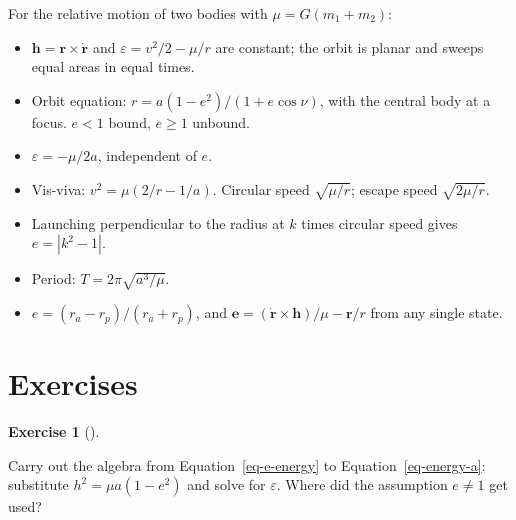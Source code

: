 \documentclass[
  10.5pt,
  letterpaper,
]{scrbook}
\providecommand{\tightlist}{%
  \setlength{\itemsep}{0pt}\setlength{\parskip}{0pt}}
\theoremstyle{definition}
\newtheorem{exercise}{Exercise}[chapter]
\theoremstyle{plain}
\theoremstyle{remark}
\begin{document}
\begin{tcolorbox}[enhanced jigsaw, arc=.35mm, bottomrule=.15mm, bottomtitle=1mm, breakable, colback=white, colbacktitle=quarto-callout-tip-color!10!white, colframe=quarto-callout-tip-color-frame, coltitle=black, left=2mm, leftrule=.75mm, opacityback=0, opacitybacktitle=0.6, rightrule=.15mm, title={Key results}, titlerule=0mm, toprule=.15mm, toptitle=1mm]

For the relative motion of two bodies with \(\mu = G(m_1 + m_2)\):

\begin{itemize}
\tightlist
\item
  \(\mathbf{h} = \mathbf{r}\times\dot{\mathbf{r}}\) and
  \(\varepsilon = v^2/2 - \mu/r\) are constant; the orbit is planar and
  sweeps equal areas in equal times.
\item
  Orbit equation: \(r = a(1-e^2)/(1+e\cos\nu)\), with the central body
  at a focus. \(e<1\) bound, \(e \ge 1\) unbound.
\item
  \(\varepsilon = -\mu/2a\), independent of \(e\).
\item
  Vis-viva: \(v^2 = \mu(2/r - 1/a)\). Circular speed \(\sqrt{\mu/r}\);
  escape speed \(\sqrt{2\mu/r}\).
\item
  Launching perpendicular to the radius at \(k\) times circular speed
  gives \(e = |k^2-1|\).
\item
  Period: \(T = 2\pi\sqrt{a^3/\mu}\).
\item
  \(e = (r_a - r_p)/(r_a + r_p)\), and
  \(\mathbf{e} = (\dot{\mathbf{r}}\times\mathbf{h})/\mu - \mathbf{r}/r\)
  from any single state.
\end{itemize}

\end{tcolorbox}

\section*{Exercises}\label{exercises-3}


\begin{exercise}[]\protect\hypertarget{exr-ch4-energy-a}{}\label{exr-ch4-energy-a}

Carry out the algebra from Equation~\ref{eq-e-energy} to
Equation~\ref{eq-energy-a}: substitute \(h^2 = \mu a (1-e^2)\) and solve
for \(\varepsilon\). Where did the assumption \(e \ne 1\) get used?

\end{exercise}
\end{document}
